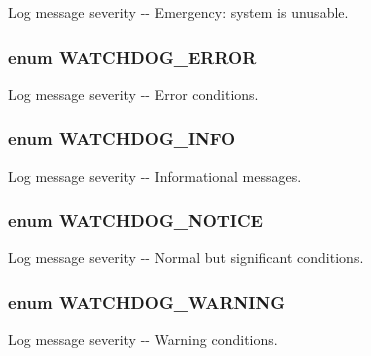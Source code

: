 \label{group__logging__severity__levels_ga467e941228edf3b033b5ef460e1bfcf7}
Log message severity -\/-\/ Emergency: system is unusable. \hypertarget{group__logging__severity__levels_ga174c9df2936096e11986fcf184d48576}{
\subsubsection[{WATCHDOG\_\-ERROR}]{\setlength{\rightskip}{0pt plus 5cm}enum {\bf WATCHDOG\_\-ERROR}}}
\label{group__logging__severity__levels_ga174c9df2936096e11986fcf184d48576}
Log message severity -\/-\/ Error conditions. \hypertarget{group__logging__severity__levels_ga9629ff808fd20ce4abb297db5976af4d}{
\subsubsection[{WATCHDOG\_\-INFO}]{\setlength{\rightskip}{0pt plus 5cm}enum {\bf WATCHDOG\_\-INFO}}}
\label{group__logging__severity__levels_ga9629ff808fd20ce4abb297db5976af4d}
Log message severity -\/-\/ Informational messages. \hypertarget{group__logging__severity__levels_ga757a33416683e8c44636a8799f60b477}{
\subsubsection[{WATCHDOG\_\-NOTICE}]{\setlength{\rightskip}{0pt plus 5cm}enum {\bf WATCHDOG\_\-NOTICE}}}
\label{group__logging__severity__levels_ga757a33416683e8c44636a8799f60b477}
Log message severity -\/-\/ Normal but significant conditions. \hypertarget{group__logging__severity__levels_ga5361f835e10b39b553ee73c1b9414bf1}{
\subsubsection[{WATCHDOG\_\-WARNING}]{\setlength{\rightskip}{0pt plus 5cm}enum {\bf WATCHDOG\_\-WARNING}}}
\label{group__logging__severity__levels_ga5361f835e10b39b553ee73c1b9414bf1}
Log message severity -\/-\/ Warning conditions. 

